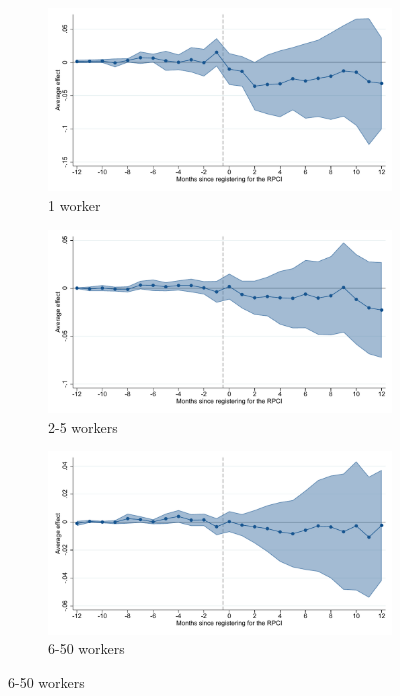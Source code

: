 \begin{figure}[H]
    \begin{subfigure}{0.32\textwidth}
    \caption{1 worker}
    \includegraphics[width=\textwidth]{04_Figures/muestra_10porciento/event_study_alta_size_1_dcdh_connected.pdf}
    \end{subfigure}
    \begin{subfigure}{0.32\textwidth}
    \caption{2-5 workers}
    \includegraphics[width=\textwidth]{04_Figures/muestra_10porciento/event_study_alta_size_2_dcdh_connected.pdf}
    \end{subfigure}
    \begin{subfigure}{0.32\textwidth}
    \caption{6-50 workers}
    \includegraphics[width=\textwidth]{04_Figures/muestra_10porciento/event_study_alta_size_6_dcdh_connected.pdf}
    \end{subfigure}
    
\end{figure}


